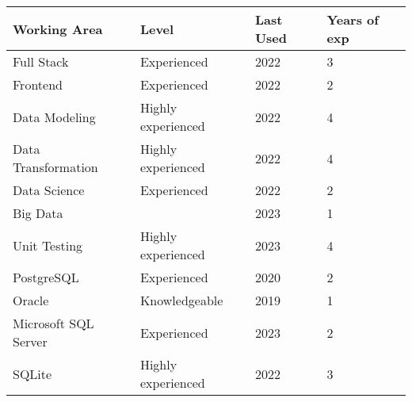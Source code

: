 
\begin{tabular}{|l|l|l|l|}
\hline
Working Area & Level & Last Used & Years of exp \\
\hline
Full Stack & Experienced & 2022 & 3 \\
Frontend & Experienced & 2022 & 2 \\
Data Modeling & Highly experienced & 2022 & 4 \\
Data Transformation & Highly experienced & 2022 & 4 \\
Data Science & Experienced & 2022 & 2 \\
Big Data & & 2023 & 1 \\
Unit Testing & Highly experienced & 2023 & 4 \\
PostgreSQL & Experienced & 2020 & 2 \\
Oracle & Knowledgeable & 2019 & 1 \\
Microsoft SQL Server & Experienced & 2023 & 2 \\
SQLite & Highly experienced & 2022 & 3 \\

\end{tabular}
